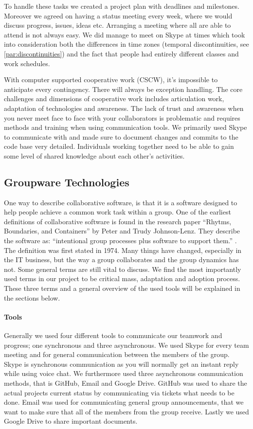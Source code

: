 To handle these tasks we created a project plan with deadlines and milestones. 
Moreover we agreed on having a status meeting every week, where we would discuss progress, issues, ideas etc. Arranging a meeting where all are able to attend is not always easy. We did manage to meet on Skype at times which took into consideration both the differences in time zones (temporal discontinuities, see \ref{par:discontinuities}) and the fact that people had entirely different classes and work schedules.

With computer supported cooperative work (CSCW), it's impossible to anticipate every contingency. There will always be exception handling. The core challenges and dimensions of cooperative work includes articulation work, adaptation of technologies and awareness. The lack of trust and awareness when you never meet face to face with your collaborators is problematic and requires methods and training when using communication tools. We primarily used Skype to communicate with and made sure to document changes and commits to the code base very detailed. Individuals working together need to be able to gain some level of shared knowledge about each other's activities.


\subsection{Groupware Technologies} \label{subsec:groupwaretechnologies}
One way to describe collaborative software, is that it is a software designed to help people achieve a common work task within a group. One of the earliest definitions of collaborative software is found in the research paper ``Rhytms, Boundaries, and Containers'' by Peter and Trudy Johnson-Lenz. They describe the software as: ``intentional group processes plus software to support them.'' \cite{johnson1991post}. The definition was first stated in 1974. Many things have changed, especially in the IT business, but the way a group collaborates and the group dynamics has not. Some general terms are still vital to discuss. We find the most importantly used terms in our project to be critical mass, adaptation and adoption process. These three terms and a general overview of the used tools will be explained in the sections below.

\paragraph{Tools} \label{par:tools}
Generally we used four different tools to communicate our teamwork and progress; one synchronous and three asynchronous. We used Skype for every team meeting and for general communication between the members of the group. Skype is synchronous communication as you will normally get an instant reply while using voice chat. We furthermore used three asynchronous communication methods, that is GitHub, Email and Google Drive. GitHub was used to share the actual projects current status by communicating via tickets what needs to be done. Email was used for communicating general group announcements, that we want to make sure that all of the members from the group receive. Lastly we used Google Drive to share important documents.  

